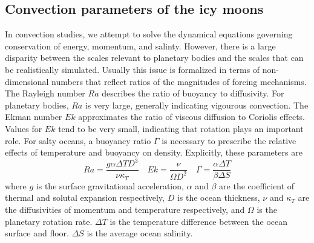 \documentclass[12pt]{article}
\begin{document}
\subsection{Convection parameters of the icy moons}
In convection studies, we attempt to solve the dynamical equations governing conservation of energy, momentum, and salinty. However, there is a large disparity between the scales relevant to planetary bodies and the scales that can be realistically simulated. 
Usually this issue is formalized in terms of non-dimensional numbers that reflect ratios of the magnitudes of forcing mechanisms. %
The Rayleigh number $Ra$ describes the ratio of buoyancy to diffusivity. For planetary bodies, $Ra$ is very large, generally indicating vigourous convection.
The Ekman number $Ek$ approximates the ratio of viscous diffusion to Coriolis effects. Values for $Ek$ tend to be very small, indicating that rotation plays an important role.
For salty oceans, a buoyancy ratio $\Gamma$ is necessary to prescribe the relative effects of temperature and buoyancy on density.
Explicitly, these parameters are
\[Ra = \frac{g\alpha\Delta T D^{3}}{\nu\kappa_{T}}\quad Ek = \frac{\nu}{\Omega D^{2}}\quad \Gamma = \frac{\alpha\Delta T}{\beta \Delta S}\]%
where $g$ is the surface gravitational acceleration, $\alpha$ and $\beta$ are the coefficient of thermal and solutal expansion respectively, $D$ is the ocean thickness, $\nu$ and $\kappa_T$ are the diffusivities of momentum and temperature respectively, and $\Omega$ is the planetary rotation rate.
$\Delta T$ is the temperature difference between the ocean surface and floor. $\Delta S$ is the average ocean salinity. 

\end{document}
